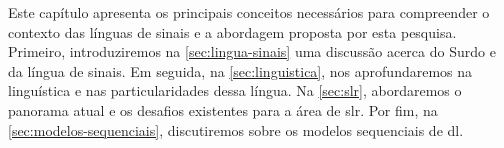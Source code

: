 Este capítulo apresenta os principais conceitos necessários para compreender o contexto das línguas de sinais e a abordagem proposta por esta pesquisa.
Primeiro, introduziremos na \autoref{sec:lingua-sinais} uma discussão acerca do Surdo e da língua de sinais.
Em seguida, na \autoref{sec:linguistica}, nos aprofundaremos na linguística e nas particularidades dessa língua.
Na \autoref{sec:slr}, abordaremos o panorama atual e os desafios existentes para a área de \acrfull{slr}.
Por fim, na \autoref{sec:modelos-sequenciais}, discutiremos sobre os modelos sequenciais de \acrlong{dl}.








